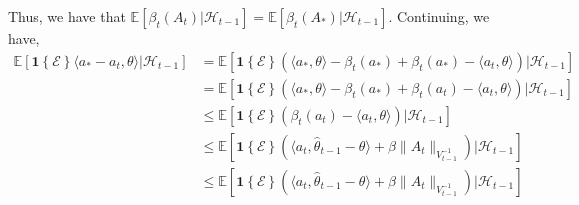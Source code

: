 \documentclass[11pt]{article}
\newcommand{\E}{\mathbb{E}}
\newcommand{\mc}[1]{\mathcal{#1}}
\newcommand{\1}[1]{\mathbf{1}\left\{#1\right\}}
\begin{document}
Thus, we have that $\E[\beta_t(A_t)|\mc{H}_{t-1}] = \E[\beta_t(A_{\ast})|\mc{H}_{t-1}]$. Continuing, we have,
\begin{align*}
    \E[\1{\mc{E}}\langle a_{\ast} - a_t, \theta \rangle|\mc{H}_{t-1}]
    &=  \E[\1{\mc{E}}(\langle a_{\ast}, \theta \rangle - \beta_t(a_{\ast}) + \beta_t(a_{\ast}) - \langle a_{t}, \theta \rangle )|\mc{H}_{t-1}]\\
    &=  \E[\1{\mc{E}}(\langle a_{\ast}, \theta \rangle - \beta_t(a_{\ast}) + \beta_t(a_{t}) - \langle a_{t}, \theta \rangle )|\mc{H}_{t-1}]\\
    & \leq \E[\1{\mc{E}}(\beta_t(a_{t}) - \langle a_{t}, \theta \rangle )|\mc{H}_{t-1}]\\
    & \leq \E[\1{\mc{E}}(\langle a_{t}, \hat{\theta}_{t-1}-\theta \rangle +\beta \|A_t\|_{V^{-1}_{t-1}})|\mc{H}_{t-1}]\\
    & \leq \E[\1{\mc{E}}(\langle a_{t}, \hat{\theta}_{t-1}-\theta \rangle +\beta \|A_t\|_{V^{-1}_{t-1}})|\mc{H}_{t-1}]
\end{align*}



\end{document}
